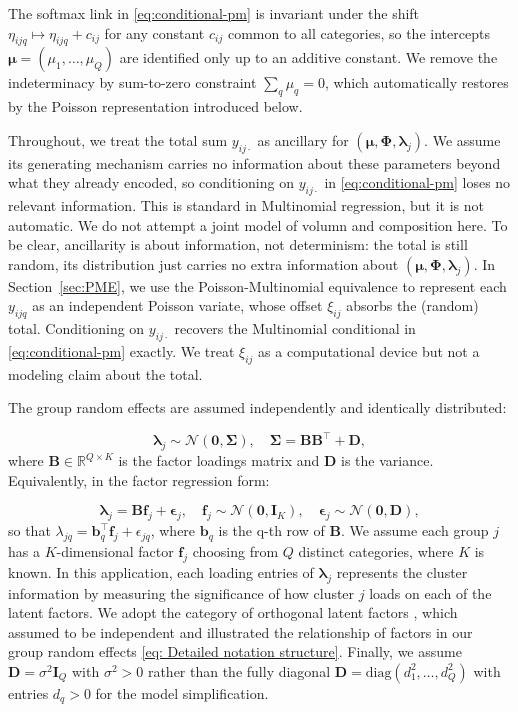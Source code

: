 The softmax link in \eqref{eq:conditional-pm} is invariant under the shift $\eta_{ijq}\mapsto\eta_{ijq}+c_{ij}$ for any constant $c_{ij}$ common to all categories, so the intercepts $\bm{\mu}=(\mu_{1},\dots,\mu_{Q})$ are identified only up to an additive constant. We remove the indeterminacy by sum-to-zero constraint $\sum_{q}\mu_{q}=0$, which automatically restores by the Poisson representation introduced below.

Throughout, we treat the total sum $y_{ij\cdot}$ as ancillary for $(\bm{\mu},\bm{\Phi},\bm{\lambda}_{j})$. We assume its generating mechanism carries no information about these parameters beyond what they already encoded, so conditioning on $y_{ij\cdot}$ in \eqref{eq:conditional-pm} loses no relevant information. This is standard in Multinomial regression, but it is not automatic. We do not attempt a joint model of volumn and composition  here. To be clear, ancillarity is about information, not determinism: the total is still random, its distribution just carries no extra information about $(\bm{\mu},\bm{\Phi},\bm{\lambda}_{j})$. In Section~\ref{sec:PME}, we use the Poisson-Multinomial equivalence to represent each $y_{ijq}$ as an independent Poisson variate, whose offset $\xi_{ij}$ absorbs the (random) total. Conditioning on $y_{ij\cdot}$ recovers the Multinomial conditional in \eqref{eq:conditional-pm} exactly. We treat $\xi_{ij}$ as a computational device but not a modeling claim about the total.

The group random effects are assumed independently and identically distributed:

\begin{equation}
    \bm{\lambda}_{j}\sim \mathcal{N}(\bm{0},\bm{\Sigma}), \quad \bm{\Sigma}=\mathbf{BB}^{\top}+\mathbf{D},
    \label{eq: Overall notation structure}
\end{equation}
where $\mathbf{B}\in \mathbb{R}^{Q\times K}$ is the factor loadings matrix and $\mathbf{D}$ is the variance. Equivalently, in the factor regression form:

\begin{equation}
    \bm{\lambda}_{j}=\mathbf{B}\mathbf{f}_{j}+
    \bm{\epsilon}_{j}, \quad \mathbf{f}_{j}\sim \mathcal{N}(\bm{0},\bm{I}_{K}), \quad \bm{\epsilon}_{j}\sim \mathcal{N}(\bm{0},\mathbf{D}),
    \label{eq: Detailed notation structure}
\end{equation}
so that $\lambda_{jq}=\mathbf{b}_{q}^{\top}\mathbf{f}_{j}+\epsilon_{jq}$, where $\mathbf{b}_{q}$ is the q-th row of $\mathbf{B}$. We assume each group $j$ has a $K$-dimensional factor $\bm{f}_{j}$ choosing from $Q$ distinct categories, where $K$ is known. In this application, each loading entries of $\bm{\lambda}_{j}$ represents the cluster information by measuring the significance of how cluster $j$ loads on each of the latent factors. We adopt the category of orthogonal latent factors \citep{Cui2026}, which assumed to be independent and illustrated the relationship of factors in our group random effects \eqref{eq: Detailed notation structure}. Finally, we assume $\mathbf{D}=\sigma^{2}\mathbf{I}_{Q}$ with $\sigma^{2} >0$ rather than the fully diagonal $\mathbf{D}=\text{diag}(d_{1}^{2},\dots,d_{Q}^{2})$ with entries $d_{q}>0$ for the model simplification.
    

